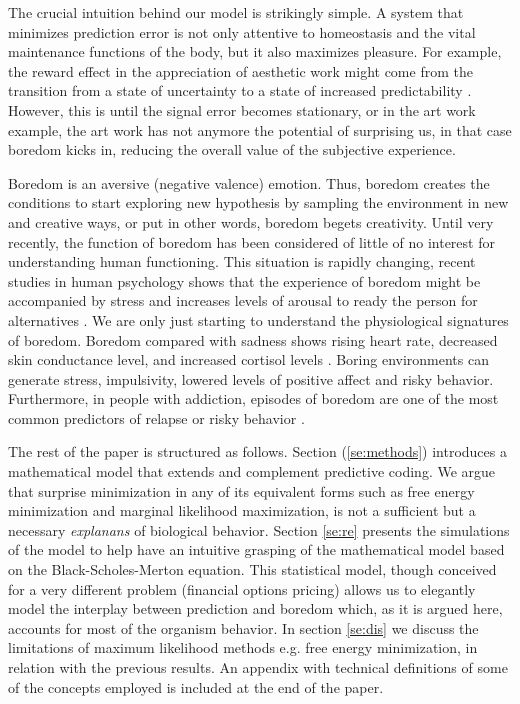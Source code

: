 \documentclass[11pt, onecolumn]{article}
\begin{document}
The crucial intuition behind our model is strikingly simple.
A system that minimizes prediction error is not only attentive to homeostasis and the vital maintenance functions of the body, but it also maximizes pleasure. For example, the reward effect in the appreciation of aesthetic work might come from the transition from a state of uncertainty to a state of increased predictability \citep{van_de_cruys_putting_2011}.
However, this is until the signal error becomes stationary, or in the art work example, the art work has not anymore the potential of surprising us, in that case boredom kicks in, reducing the overall value of the subjective experience.

Boredom is an aversive (negative valence) emotion. Thus, boredom creates the conditions to start exploring new hypothesis by sampling the environment in new and creative ways, or put in other words, boredom begets creativity. 
Until very recently, the function of boredom has been considered of little of no interest for understanding human functioning. This situation is rapidly changing, 
recent studies in human psychology shows that the experience of boredom might be accompanied by stress and increases levels of arousal to ready the person for alternatives \citep{posner_neurophysiological_2009} \citep{bench_function_2013}. We are only just starting to understand the physiological signatures of boredom. Boredom compared with sadness shows rising heart rate, decreased skin conductance level, and increased cortisol levels \citep{merrifield_characterizing_2014}. Boring environments can generate stress, impulsivity, lowered levels of positive affect and risky behavior. Furthermore, in people with addiction, episodes of  boredom are one of the most common predictors of relapse or risky behavior \citep{blaszczynski_boredom_1990}.

The rest of the paper is structured as follows. Section (\ref{se:methods})  introduces a mathematical model that extends and complement predictive coding. We argue that surprise minimization in any of its equivalent forms such as free energy minimization and marginal likelihood maximization, is not a sufficient but a necessary \emph{explanans} of biological behavior. Section \ref{se:re} presents the simulations of the model to help have an intuitive grasping of the mathematical model based on the Black-Scholes-Merton equation. This statistical model, though conceived for a very different problem (financial options pricing) allows us to elegantly model the interplay between prediction and boredom which, as it is argued here, accounts for most of the organism behavior.
In section \ref{se:dis} we discuss the limitations of maximum likelihood methods e.g. free energy minimization, in relation with the previous results.
An appendix with technical definitions of some of the concepts employed is included at the end of the paper.
\end{document}

